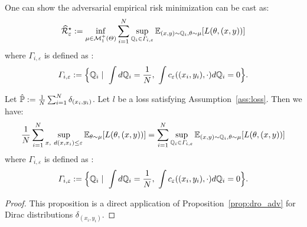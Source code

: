 One can show the adversarial empirical risk minimization can be cast as:
\begin{align*}
\widehat{\mathcal{R}}_{\varepsilon}^{\star}:=\inf_{\mu\in \mathcal{M}^+_1(\Theta)}\sum_{i=1}^\numsamples\sup_{\QQ_i\in\Gamma_{i,\varepsilon}}\mathbb{E}_{(x,y)\sim \QQ_i,\theta \sim \mu}\left[\loss(\theta,(x,y))\right]
\end{align*}
where $\Gamma_{i,\varepsilon}$ is defined as : 
\begin{align*}
    \Gamma_{i,\varepsilon}:=\Big\{\mathbb{Q}_i\mid~\int d\mathbb{Q}_i=\frac{1}{N},~\int c_{\varepsilon}((x_i,y_i),\cdot) d\mathbb{Q}_i=0\Big\}.
\end{align*}
\begin{prop}
    Let $\hat{\mathbb{P}}:=\frac1{N}\sum_{i=1}^N \delta_{(x_i,y_i)}$. Let $l$ be a loss satisfying Assumption~\ref{ass:loss}. Then we have:
    \begin{align*}
    \frac{1}{N}\sum_{i=1}^N\sup_{x,~d(x,x_i)\leq\varepsilon}\mathbb{E}_{\theta \sim \mu}\left[\loss(\theta,(x,y))\right]=\sum_{i=1}^N\sup_{\QQ_i\in\Gamma_{i,\varepsilon}}\mathbb{E}_{(x,y)\sim \QQ_i,\theta \sim \mu}\left[\loss(\theta,(x,y))\right]
    \end{align*}
    where $\Gamma_{i,\varepsilon}$ is defined as : 
    \begin{align*}
        \Gamma_{i,\varepsilon}:=\Big\{\mathbb{Q}_i\mid~\int d\mathbb{Q}_i=\frac{1}{N},~\int c_{\varepsilon}((x_i,y_i),\cdot) d\mathbb{Q}_i=0\Big\}.
    \end{align*}\end{prop}
    
    \begin{proof}
    This proposition is a direct application of Proposition~\ref{prop:dro_adv} for Dirac distributions $\delta_{(x_i,y_i)}$.
    \end{proof}
    
